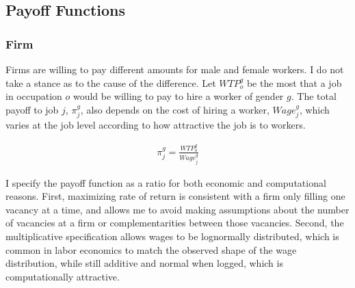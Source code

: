 \documentclass[12pt]{article}
\begin{document}

\subsection{Payoff Functions}
\subsubsection{Firm}



Firms are willing to pay different amounts for male and female workers. I do not take a stance as to the cause of the difference. Let $WTP^g_o$ be the most that a job in occupation $o$ would be willing to pay to hire a worker of gender $g$. The total payoff to job $j$, $\pi^g_j$, also depends on the cost of hiring a worker, ${Wage^g_j}$, which varies at the job level according to how attractive the job is to workers.

\begin{align} \label{firm}
 \pi^g_j = \frac{WTP^g_o}{Wage^g_j} 
\end{align}

I specify the payoff function as a ratio for both economic and computational reasons. First, maximizing rate of return is consistent with a firm only filling one vacancy at a time, and allows me to avoid making assumptions about the number of vacancies at a firm or complementarities between those vacancies. Second, the multiplicative specification allows wages to be lognormally distributed, which is common in labor economics to match the observed shape of the wage distribution, while still additive and normal when logged, which is computationally attractive. 
\end{document}
